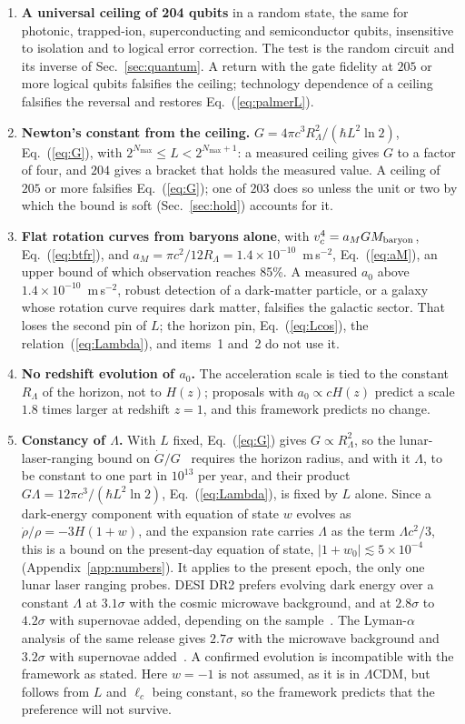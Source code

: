 \documentclass[aps,prd,twocolumn,superscriptaddress,nofootinbib,showkeys]{revtex4-2}
\newcommand{\lc}{\ell_c}
\newcommand{\RL}{R_\Lambda}
\begin{document}
\begin{enumerate}
\item \textbf{A universal ceiling of 204 qubits} in a random state, the same for photonic, trapped-ion, superconducting and semiconductor qubits, insensitive to isolation and to logical error correction. The test is the random circuit and its inverse of Sec.~\ref{sec:quantum}. A return with the gate fidelity at $205$ or more logical qubits falsifies the ceiling; technology dependence of a ceiling falsifies the reversal and restores Eq.~(\ref{eq:palmerL}).
\item {\boldmath\textbf{Newton's constant from the ceiling.}} $G = 4\pi c^3\RL^2/(\hbar L^2\ln2)$, Eq.~(\ref{eq:G}), with $2^{N_{\max}}\le L<2^{N_{\max}+1}$: a measured ceiling gives $G$ to a factor of four, and $204$ gives a bracket that holds the measured value. A ceiling of $205$ or more falsifies Eq.~(\ref{eq:G}); one of $203$ does so unless the unit or two by which the bound is soft (Sec.~\ref{sec:hold}) accounts for it.
\item \textbf{Flat rotation curves from baryons alone}, with $v_c^4 = a_M G M_{\rm baryon}$, Eq.~(\ref{eq:btfr}), and $a_M = \pi c^2/12\RL = 1.4\times10^{-10}$~m\,s$^{-2}$, Eq.~(\ref{eq:aM}), an upper bound of which observation reaches 85\%. A measured $a_0$ above $1.4\times10^{-10}$~m\,s$^{-2}$, robust detection of a dark-matter particle, or a galaxy whose rotation curve requires dark matter, falsifies the galactic sector. That loses the second pin of $L$; the horizon pin, Eq.~(\ref{eq:Lcos}), the relation~(\ref{eq:Lambda}), and items~1 and~2 do not use it.
\item {\boldmath\textbf{No redshift evolution of $a_0$.}} The acceleration scale is tied to the constant $\RL$ of the horizon, not to $H(z)$; proposals with $a_0\propto cH(z)$ predict a scale $1.8$ times larger at redshift $z=1$, and this framework predicts no change.
\item {\boldmath\textbf{Constancy of $\Lambda$.}} With $L$ fixed, Eq.~(\ref{eq:G}) gives $G\propto\RL^2$, so the lunar-laser-ranging bound on $\dot G/G$~\cite{hofmann2018} requires the horizon radius, and with it $\Lambda$, to be constant to one part in $10^{13}$ per year, and their product $G\Lambda = 12\pi c^3/(\hbar L^2\ln2)$, Eq.~(\ref{eq:Lambda}), is fixed by $L$ alone. Since a dark-energy component with equation of state $w$ evolves as $\dot\rho/\rho = -3H(1+w)$, and the expansion rate carries $\Lambda$ as the term $\Lambda c^2/3$, this is a bound on the present-day equation of state, $|1+w_0| \lesssim 5\times10^{-4}$ (Appendix~\ref{app:numbers}). It applies to the present epoch, the only one lunar laser ranging probes. DESI DR2 prefers evolving dark energy over a constant $\Lambda$ at $3.1\sigma$ with the cosmic microwave background, and at $2.8\sigma$ to $4.2\sigma$ with supernovae added, depending on the sample~\cite{desi2025}. The Lyman-$\alpha$ analysis of the same release gives $2.7\sigma$ with the microwave background and $3.2\sigma$ with supernovae added~\cite{desi2026}. A confirmed evolution is incompatible with the framework as stated. Here $w=-1$ is not assumed, as it is in $\Lambda$CDM, but follows from $L$ and $\lc$ being constant, so the framework predicts that the preference will not survive.

\end{enumerate}
\end{document}
